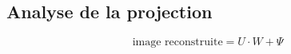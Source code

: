 \documentclass{beamer}
\theoremstyle{plain}
\theoremstyle{definition}
\begin{document}
%



\subsection{Analyse de la projection}
\begin{frame}
  \[
    \text{image reconstruite} = U \cdot W + \Psi
  \]

  \pause


\end{frame}
\end{document}
